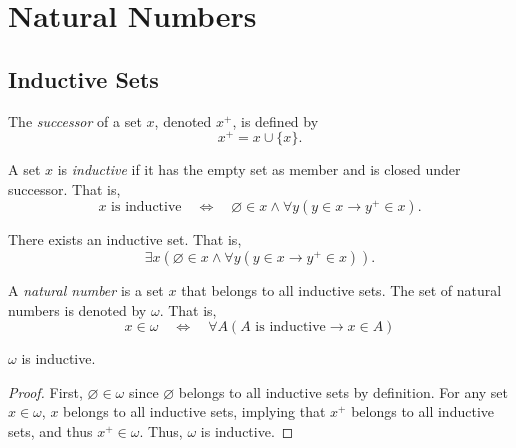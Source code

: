 \chapter{Natural Numbers}
\section{Inductive Sets}
\begin{definition}
  The \emph{successor} of a set $x$, denoted $x^+$, is defined by
  \begin{equation*}
    x^+ = x \cup \{x\}.
  \end{equation*}
\end{definition}

\begin{definition}
  A set $x$ is \emph{inductive} if it has the empty set as member and is closed
  under successor.
  That is,
  \begin{equation*}
    \text{$x$ is inductive}
    \quad \Leftrightarrow \quad
    \varnothing \in x \wedge \forall y (y \in x \to y^+ \in x).
  \end{equation*}
\end{definition}

\begin{axiom}[Infinity]
  There exists an inductive set.
  That is,
  \begin{equation*}
    \exists x (\varnothing \in x \wedge \forall y (y \in x \to y^+ \in x)).
  \end{equation*}
\end{axiom}

\begin{definition}
  A \emph{natural number} is a set $x$ that belongs to all inductive sets.
  The set of natural numbers is denoted by $\omega$.
  That is,
  \begin{equation*}
    x \in \omega
    \quad \Leftrightarrow \quad
    \forall A (\text{$A$ is inductive} \to x \in A)
  \end{equation*}
\end{definition}

\begin{theorem}
  $\omega$ is inductive.
\end{theorem}
\begin{proof}
  First, $\varnothing \in \omega$ since $\varnothing$ belongs to all inductive
  sets by definition.
  For any set $x \in \omega$, $x$ belongs to all inductive sets, implying that
  $x^+$ belongs to all inductive sets, and thus $x^+ \in \omega$.
  Thus, $\omega$ is inductive.
\end{proof}

